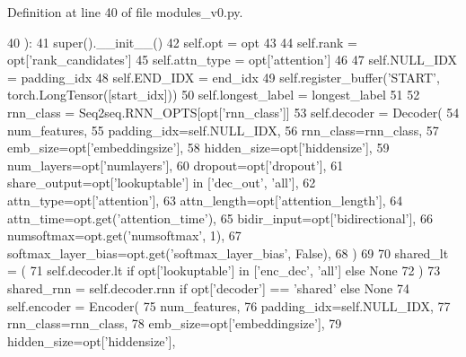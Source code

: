 Definition at line 40 of file modules\+\_\+v0.\+py.


\begin{DoxyCode}
40     ):
41         super().\_\_init\_\_()
42         self.opt = opt
43 
44         self.rank = opt[\textcolor{stringliteral}{'rank\_candidates'}]
45         self.attn\_type = opt[\textcolor{stringliteral}{'attention'}]
46 
47         self.NULL\_IDX = padding\_idx
48         self.END\_IDX = end\_idx
49         self.register\_buffer(\textcolor{stringliteral}{'START'}, torch.LongTensor([start\_idx]))
50         self.longest\_label = longest\_label
51 
52         rnn\_class = Seq2seq.RNN\_OPTS[opt[\textcolor{stringliteral}{'rnn\_class'}]]
53         self.decoder = Decoder(
54             num\_features,
55             padding\_idx=self.NULL\_IDX,
56             rnn\_class=rnn\_class,
57             emb\_size=opt[\textcolor{stringliteral}{'embeddingsize'}],
58             hidden\_size=opt[\textcolor{stringliteral}{'hiddensize'}],
59             num\_layers=opt[\textcolor{stringliteral}{'numlayers'}],
60             dropout=opt[\textcolor{stringliteral}{'dropout'}],
61             share\_output=opt[\textcolor{stringliteral}{'lookuptable'}] \textcolor{keywordflow}{in} [\textcolor{stringliteral}{'dec\_out'}, \textcolor{stringliteral}{'all'}],
62             attn\_type=opt[\textcolor{stringliteral}{'attention'}],
63             attn\_length=opt[\textcolor{stringliteral}{'attention\_length'}],
64             attn\_time=opt.get(\textcolor{stringliteral}{'attention\_time'}),
65             bidir\_input=opt[\textcolor{stringliteral}{'bidirectional'}],
66             numsoftmax=opt.get(\textcolor{stringliteral}{'numsoftmax'}, 1),
67             softmax\_layer\_bias=opt.get(\textcolor{stringliteral}{'softmax\_layer\_bias'}, \textcolor{keyword}{False}),
68         )
69 
70         shared\_lt = (
71             self.decoder.lt \textcolor{keywordflow}{if} opt[\textcolor{stringliteral}{'lookuptable'}] \textcolor{keywordflow}{in} [\textcolor{stringliteral}{'enc\_dec'}, \textcolor{stringliteral}{'all'}] \textcolor{keywordflow}{else} \textcolor{keywordtype}{None}
72         )
73         shared\_rnn = self.decoder.rnn \textcolor{keywordflow}{if} opt[\textcolor{stringliteral}{'decoder'}] == \textcolor{stringliteral}{'shared'} \textcolor{keywordflow}{else} \textcolor{keywordtype}{None}
74         self.encoder = Encoder(
75             num\_features,
76             padding\_idx=self.NULL\_IDX,
77             rnn\_class=rnn\_class,
78             emb\_size=opt[\textcolor{stringliteral}{'embeddingsize'}],
79             hidden\_size=opt[\textcolor{stringliteral}{'hiddensize'}],

\end{DoxyCode}
